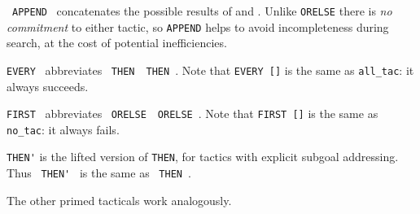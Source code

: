 \begin{isabellebody}
\begin{isamarkuptext}
\begin{description}
  \item {}~\verb|APPEND|~ concatenates the
  possible results of  and .  Unlike
  \verb|ORELSE| there is \emph{no commitment} to either tactic, so
  \verb|APPEND| helps to avoid incompleteness during search, at
  the cost of potential inefficiencies.

  \item \verb|EVERY|~ abbreviates ~\verb|THEN|~~\verb|THEN|~.
  Note that \verb|EVERY []| is the same as \verb|all_tac|: it always
  succeeds.

  \item \verb|FIRST|~ abbreviates ~\verb|ORELSE|~~\verb|ORELSE|~.  Note that \verb|FIRST []| is the same as \verb|no_tac|: it
  always fails.

  \item \verb|THEN'| is the lifted version of \verb|THEN|, for
  tactics with explicit subgoal addressing.  Thus ~\verb|THEN'|~ is the same as ~\verb|THEN|~.

  The other primed tacticals work analogously.


\end{description}
\end{isamarkuptext}
\end{isabellebody}

